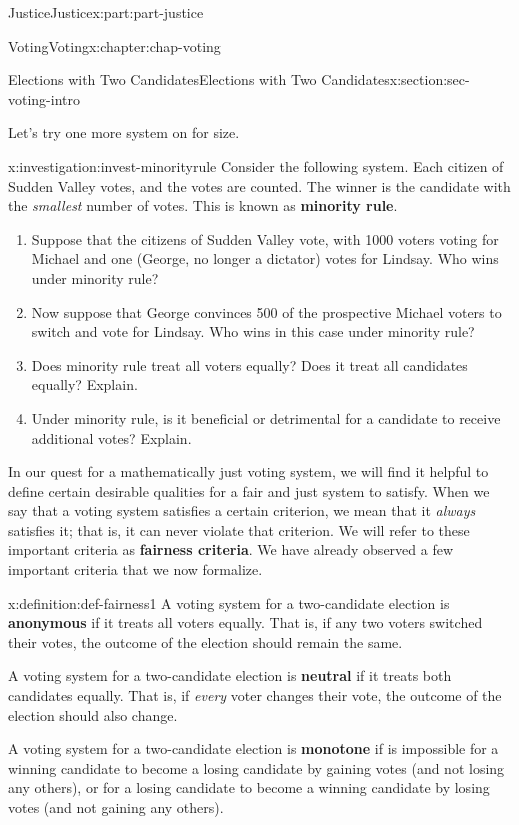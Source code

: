 \documentclass[oneside,10pt,]{book}
\newcommand{\terminology}[1]{\textbf{#1}}
\numberwithin{equation}{section}
\begin{document}
\begin{partptx}{Justice}{}{Justice}{}{}{x:part:part-justice}
\begin{chapterptx}{Voting}{}{Voting}{}{}{x:chapter:chap-voting}
\begin{sectionptx}{Elections with Two Candidates}{}{Elections with Two Candidates}{}{}{x:section:sec-voting-intro}
\par
Let's try one more system on for size.%
\begin{investigation}{}{x:investigation:invest-minorityrule}%
Consider the following system. Each citizen of Sudden Valley votes, and the votes are counted. The winner is the candidate with the \emph{smallest} number of votes. This is known as \terminology{minority rule}.%
%
\begin{enumerate}
\item{}Suppose that the citizens of Sudden Valley vote, with 1000 voters voting for Michael and one (George, no longer a dictator) votes for Lindsay. Who wins under minority rule?%
\item{}Now suppose that George convinces 500 of the prospective Michael voters to switch and vote for Lindsay. Who wins in this case under minority rule?%
\item{}Does minority rule treat all voters equally? Does it treat all candidates equally? Explain.%
\item{}Under minority rule, is it beneficial or detrimental for a candidate to receive additional votes? Explain.%
\end{enumerate}
\end{investigation}%
 In our quest for a mathematically just voting system, we will find it helpful to define certain desirable qualities for a fair and just system to satisfy. When we say that a voting system satisfies a certain criterion, we mean that it \emph{always} satisfies it; that is, it can never violate that criterion. We will refer to these important criteria as \terminology{fairness criteria}. We have already observed a few important criteria that we now formalize.%
\begin{definition}{}{x:definition:def-fairness1}%
%
%
%
A voting system for a two-candidate election is \terminology{anonymous} if it treats all voters equally. That is, if any two voters switched their votes, the outcome of the election should remain the same.%
\par
A voting system for a two-candidate election is \terminology{neutral} if it treats both candidates equally. That is, if \emph{every} voter changes their vote, the outcome of the election should also change.%
\par
A voting system for a two-candidate election is \terminology{monotone} if is impossible for a winning candidate to become a losing candidate by gaining votes (and not losing any others), or for a losing candidate to become a winning candidate by losing votes (and not gaining any others).%

\end{definition}
\end{sectionptx}
\end{chapterptx}
\end{partptx}
\end{document}
